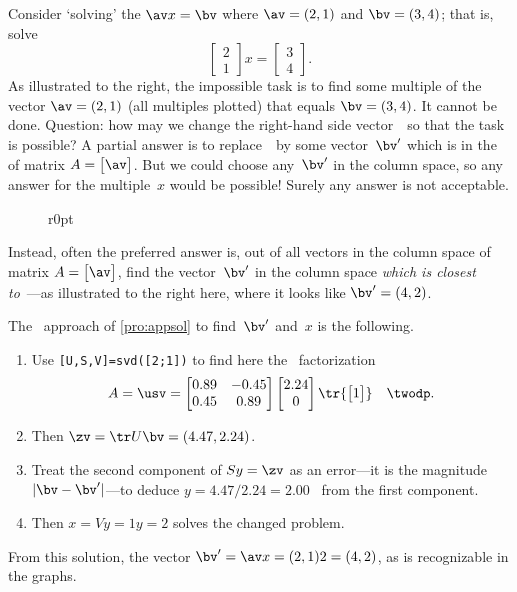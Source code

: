 \begin{example} \label{eg:incon1}
Consider `solving' the  \(\av x=\bv\) where \(\av=(2,1)\) and \(\bv=(3,4)\); that is, solve
\begin{equation*}
\begin{bmatrix} 2\\1 \end{bmatrix}x=\begin{bmatrix} 3\\4 \end{bmatrix}.
\end{equation*}
As illustrated to the right, the impossible task is to find some multiple of the vector \(\av=(2,1)\) (all multiples plotted) that equals \(\bv=(3,4)\).
It cannot be done.
Question: how may we change the right-hand side vector~\bv\ so that the task is possible?  
A partial answer is to replace~\bv\ by some vector~\(\bv'\) which is in the  of matrix \(A=\begin{bmatrix} \av \end{bmatrix}\).
But we could choose any~\(\bv'\) in the column space, so any answer for the multiple~\(x\) would be possible! Surely any answer is not acceptable.

\begin{wrapfigure}r{0pt}  \end{wrapfigure}
Instead, often the preferred answer is, out of all vectors in the column space of matrix \(A=\begin{bmatrix} \av \end{bmatrix}\),  find the vector~\(\bv'\) in the column space \emph{which is closest to}~\bv---as illustrated to the right here, where it looks like \(\bv'=(4,2)\).

The \svd\ approach of \cref{pro:appsol} to find~\(\bv'\) and~\(x\) is the following.
\begin{enumerate}
\item Use \verb|[U,S,V]=svd([2;1])| to find here the \svd\ factorization \begin{equation*}
A=\usv=\begin{bmatrix} 0.89&-0.45\\0.45&0.89 \end{bmatrix} \begin{bmatrix} 2.24\\0 \end{bmatrix}\tr{\begin{bmatrix} 1 \end{bmatrix}}\quad \twodp.
\end{equation*}
\item Then \(\zv=\tr U\bv=(4.47,2.24)\).
\item Treat the second component of \(Sy=\zv\) as an error---it is the magnitude \(|\bv-\bv'|\)---to deduce \(y=4.47/2.24=2.00\) \twodp\ from the first component.
\item Then  \(x=Vy=1y=2\) solves the changed problem.
\end{enumerate}
From this solution, the vector \(\bv'=\av x=(2,1)2=(4,2)\), as is recognizable in the graphs.
\end{example}

